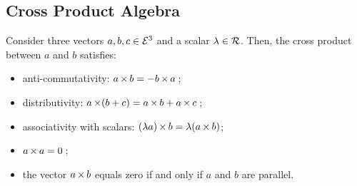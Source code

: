 \subsection{Cross Product Algebra}
Consider three vectors $a,b,c\in\mathcal{E}^{3}$ and a scalar $\lambda\in\mathcal{R}$. Then, the cross product between $a$ and $b$ satisfies:
\begin{itemize}
\item anti-commutativity: $a\operatorname{\times} b = -b\operatorname{\times} a$\,;
\item distributivity: $a\operatorname{\times}(b + c) = a\operatorname{\times} b + a\operatorname{\times} c$\,;
\item associativity with scalars: $(\lambda a)\operatorname{\times} b = \lambda(a\operatorname{\times} b)$;
\item $a\operatorname{\times} a = 0$\,;
\item the vector $a\operatorname{\times} b$ equals zero if and only if $a$ and $b$ are parallel.
\end{itemize}



